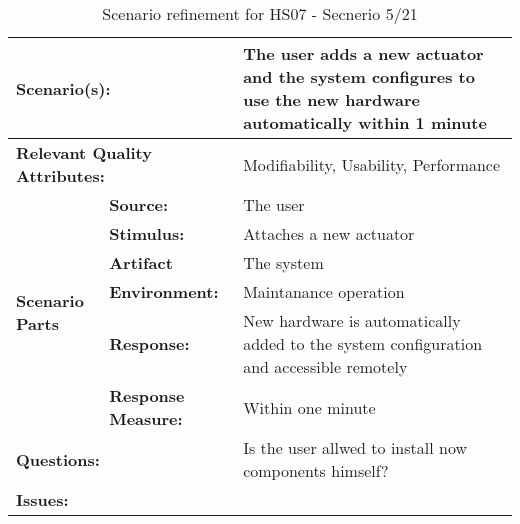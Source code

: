 \documentclass[10pt,a4paper]{article}
\begin{document}
\begin{table}[!htp]
\begin{center}
\begin{tabular}{|p{0.3cm}|p{2.5cm}|p{8cm}|}
  \hline
  \multicolumn{2}{|p{3cm}|}{\bfseries Scenario(s):} & The user adds a new actuator and the system configures to use the new hardware automatically within 1 minute \\
  \hline
  \multicolumn{2}{|p{3cm}|}{\bfseries Relevant Quality Attributes:} & Modifiability, Usability, Performance \\
  \hline
  \multirow{6}{*}{\begin{sideways}{\bfseries Scenario Parts}\end{sideways}}
  & {\bfseries Source:} & The user \\
  \cline{2-3}
  & {\bfseries Stimulus:} & Attaches a new actuator \\
  \cline{2-3}
  & {\bfseries Artifact} & The system \\
  \cline{2-3}
  & {\bfseries Environment:} & Maintanance operation \\
  \cline{2-3}
  & {\bfseries Response:} & New hardware is automatically added to the system configuration and accessible remotely \\
  \cline{2-3}
  & {\bfseries Response Measure:} & Within one minute \\
  \hline
  \multicolumn{2}{|p{3cm}|}{\bfseries Questions:} & Is the user allwed to install now components himself? \\
  \hline
  \multicolumn{2}{|p{3cm}|}{\bfseries Issues:} &  \\
  \hline
\end{tabular}
\caption{Scenario refinement for HS07 - Secnerio 5/21}
\end{center}
\end{table}
\end{document}
